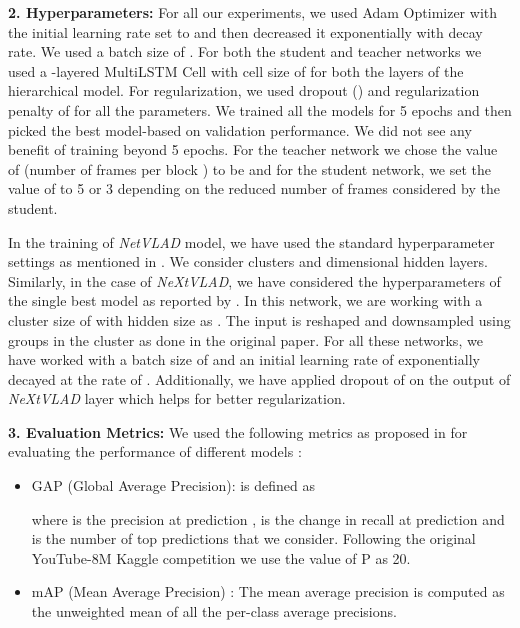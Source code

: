\documentclass[10pt,twocolumn,letterpaper]{article}
\begin{document}
\noindent \textbf{2. Hyperparameters:}
For all our experiments, we used Adam Optimizer with the initial learning rate set to   and then decreased it exponentially with  decay rate. We used a batch size of . For both the student and teacher networks we used a -layered MultiLSTM Cell with cell size of  for both the layers of the hierarchical model. For regularization, we used dropout () and  regularization penalty of  for all the parameters. We trained all the models for 5 epochs and then picked the best model-based on validation performance. We did not see any benefit of training beyond 5 epochs. For the teacher network we chose the value of  (number of frames per block ) to be  and for the student network, we set the value of  to 5 or 3 depending on the reduced number of frames considered by the student.

In the training of \textit{NetVLAD} model, we have used the standard hyperparameter settings as mentioned in \cite{willow}. We consider  clusters and  dimensional hidden layers. Similarly, in the case of \textit{NeXtVLAD}, we have considered the hyperparameters of the single best model as reported by \cite{paper3}. In this network, we are working with a cluster size of  with hidden size as . The input is reshaped and downsampled using  groups in the cluster as done in the original paper. For all these networks, we have worked with a batch size of  and an initial learning rate of  exponentially decayed at the rate of . Additionally, we have applied dropout of  on the output of \textit{NeXtVLAD} layer which helps for better regularization. 



\noindent \textbf{3. Evaluation Metrics:} We used the following metrics as proposed in \cite{Youtube8m} for evaluating the performance of different models :
\begin{itemize}[leftmargin=*,noitemsep]
\item GAP (Global Average Precision): is defined as

where  is the precision at prediction ,  is the
change in recall at prediction  and  is the number of top predictions that we consider. Following the original YouTube-8M Kaggle competition we use the value of P as 20.
\item mAP (Mean Average Precision) : The mean average precision is computed
as the unweighted mean of all the per-class average precisions.
\end{itemize}
\end{document}
